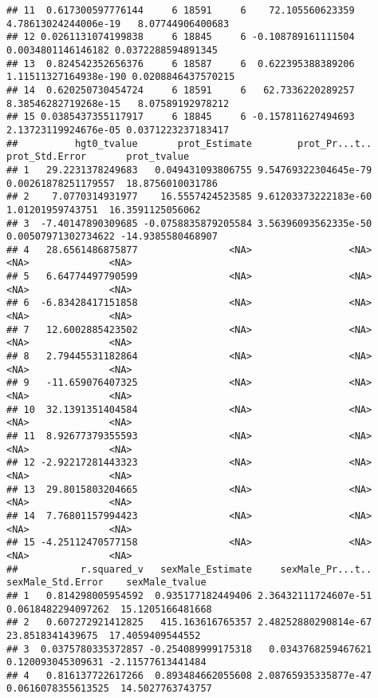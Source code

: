 \documentclass[
]{book}
\begin{document}
\begin{verbatim}
## 11  0.617300597776144     6 18591     6    72.105560623359  4.78613024244006e-19   8.07744906400683
## 12 0.0261131074199838     6 18845     6 -0.108789161111504    0.0034801146146182 0.0372288594891345
## 13  0.824542352656376     6 18587     6  0.622395388389206 1.11511327164938e-190 0.0208846437570215
## 14  0.620250730454724     6 18591     6   62.7336220289257  8.38546282719268e-15   8.07589192978212
## 15 0.0385437355117917     6 18845     6 -0.157811627494693  2.13723119924676e-05 0.0371223237183417
##          hgt0_tvalue       prot_Estimate        prot_Pr...t..      prot_Std.Error       prot_tvalue
## 1   29.2231378249683   0.049431093806755 9.54769322304645e-79 0.00261878251179557  18.8756010031786
## 2    7.0770314931977    16.5557424523585 9.61203373222183e-60    1.01201959743751  16.3591125056062
## 3  -7.40147890309685 -0.0758835879205584 3.56396093562335e-50 0.00507971302734622 -14.9385580468907
## 4   28.6561486875877                <NA>                 <NA>                <NA>              <NA>
## 5   6.64774497790599                <NA>                 <NA>                <NA>              <NA>
## 6  -6.83428417151858                <NA>                 <NA>                <NA>              <NA>
## 7   12.6002885423502                <NA>                 <NA>                <NA>              <NA>
## 8   2.79445531182864                <NA>                 <NA>                <NA>              <NA>
## 9   -11.659076407325                <NA>                 <NA>                <NA>              <NA>
## 10  32.1391351404584                <NA>                 <NA>                <NA>              <NA>
## 11  8.92677379355593                <NA>                 <NA>                <NA>              <NA>
## 12 -2.92217281443323                <NA>                 <NA>                <NA>              <NA>
## 13  29.8015803204665                <NA>                 <NA>                <NA>              <NA>
## 14  7.76801157994423                <NA>                 <NA>                <NA>              <NA>
## 15 -4.25112470577158                <NA>                 <NA>                <NA>              <NA>
##           r.squared_v   sexMale_Estimate     sexMale_Pr...t..  sexMale_Std.Error    sexMale_tvalue
## 1   0.814298005954592  0.935177182449406 2.36432111724607e-51 0.0618482294097262  15.1205166481668
## 2   0.607272921412825   415.163616765357 2.48252880290814e-67   23.8518341439675  17.4059409544552
## 3  0.0375780335372857 -0.254089999175318   0.0343768259467621  0.120093045309631 -2.11577613441484
## 4   0.816137722617266  0.893484662055608 2.08765935335877e-47 0.0616078355613525  14.5027763743757

\end{verbatim}
\end{document}
